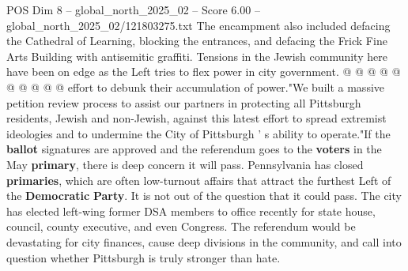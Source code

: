 \begin{textsample}{POS Dim 8 – global\_north\_2025\_02 – Score 6.00 – global\_north\_2025\_02/121803275.txt}
The encampment also included defacing the Cathedral of Learning, blocking the entrances, and defacing the Frick Fine Arts Building with antisemitic graffiti.
Tensions in the Jewish community here have been on edge as the Left tries to flex power in city government. @ @ @ @ @ @ @ @ @ @ effort to debunk their accumulation of power."We built a massive petition review process to assist our partners in protecting all Pittsburgh residents, Jewish and non-Jewish, against this latest effort to spread extremist ideologies and to undermine the City of Pittsburgh ' s ability to operate."If the \textbf{ballot} signatures are approved and the referendum goes to the \textbf{voters} in the May \textbf{primary}, there is deep concern it will pass.
Pennsylvania has closed \textbf{primaries}, which are often low-turnout affairs that attract the furthest Left of the \textbf{Democratic} \textbf{Party}.
It is not out of the question that it could pass.
The city has elected left-wing former DSA members to office recently for state house, council, county executive, and even Congress.
The referendum would be devastating for city finances, cause deep divisions in the community, and call into question whether Pittsburgh is truly stronger than hate.

\end{textsample}
